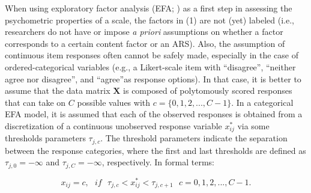 \documentclass[a4paper,man,natbib]{apa6}
\begin{document}
\begin{linenumbers}
When using exploratory factor analysis (EFA; \citealp{lawley1962factor}) as a first step in assessing the psychometric properties of a scale, the factors in (1) are not (yet) labeled (i.e., researchers do not have or impose \textit{a priori} assumptions on whether a factor corresponds to a certain content factor or an ARS). %
Also, the assumption of continuous item responses often cannot be safely made, especially in the case of ordered-categorical variables (e.g., a Likert-scale item with \textquotedblleft disagree\textquotedblright, \textquotedblleft neither agree nor disagree\textquotedblright, and \textquotedblleft agree\textquotedblright as response options). In that case, it is better to assume that the data matrix $\textbf{X}$ is composed of polytomously scored responses that can take on $C$ possible values with $c = \{0,1,2,...,C-1\}$. %
In a categorical EFA model, it is assumed that each of the observed responses is obtained from a discretization of a continuous unobserved response variable ${x}^{*}_{ij}$ via some thresholds parameters $\tau_{j,c}$. The threshold parameters indicate the separation between the response categories, where the first and last thresholds are defined as $\tau_{j,0} = -\infty$ and $\tau_{j,C} = -\infty$, respectively. In formal terms:

\begin{equation}
x_{ij} =  c, \,\,\,\,  if \,\,\,\, \tau_{j,c} < x_{ij}^{*} < \tau_{j,c+1} \,\,\,\, \textit{c} =0, 1,2,...,C-1.
\end{equation} 


\end{linenumbers}
\end{document}
